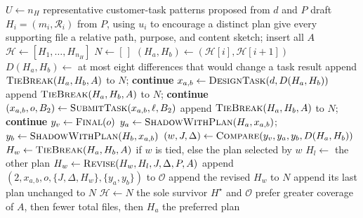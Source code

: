 \begin{algorithm*}[t]
\caption{Stage~2 adjacent-pair comparison of candidate skill plans.}
\label{alg:dd-stage2}
\scriptsize
\begin{algorithmic}[1]
  \State $U\gets n_H$ representative customer-task patterns proposed from $d$ and $P$
    \State draft $H_i=(m_i,\mathcal{R}_i)$ from $P$, using $u_i$ to encourage a distinct plan
    \State give every supporting file a relative path, purpose, and content sketch; insert all $A$
  \EndFor
  \State $\mathcal{H}\gets[H_1,\ldots,H_{n_H}]$
    \State $N\gets[\,]$
      \State $(H_a,H_b)\gets(\mathcal{H}[i],\mathcal{H}[i+1])$
      \State $D(H_a,H_b)\gets$ at most eight differences that would change a task result
        \State append $\Call{TieBreak}{H_a,H_b,A}$ to $N$; \textbf{continue}
      \EndIf
      \State $x_{a,b}\gets\Call{DesignTask}{d,D(H_a,H_b)}$
        \State append $\Call{TieBreak}{H_a,H_b,A}$ to $N$; \textbf{continue}
      \EndIf
      \State $(x_{a,b},o,B_2)\gets\Call{SubmitTask}{x_{a,b},\ell,B_2}$
        \State append $\Call{TieBreak}{H_a,H_b,A}$ to $N$; \textbf{continue}
      \EndIf
      \State $y_v\gets\Call{Final}{o}$
      \State $y_a\gets\Call{ShadowWithPlan}{H_a,x_{a,b}}$;
             $y_b\gets\Call{ShadowWithPlan}{H_b,x_{a,b}}$
      \State $(w,J,\Delta)\gets\Call{Compare}{y_v,y_a,y_b,D(H_a,H_b)}$
      \State $H_w\gets\Call{TieBreak}{H_a,H_b,A}$ if $w$ is tied, else the plan selected by $w$
      \State $H_l\gets$ the other plan
        \State $H_w\gets\Call{Revise}{H_w,H_l,J,\Delta,P,A}$
      \EndIf
      \State append $(2,x_{a,b},o,\{J,\Delta,H_w\},\{y_a,y_b\})$ to $\mathcal{O}$
      \State append the revised $H_w$ to $N$
    \EndFor
     \State append its last plan unchanged to $N$  \EndIf
    \State $\mathcal{H}\gets N$
  \EndWhile
  \State \Return the sole survivor $H^\star$ and $\mathcal{O}$
\EndProcedure
\Statex
{}
  \State prefer greater coverage of $A$, then fewer total files, then $H_a$
  \State \Return the preferred plan
\EndProcedure
\end{algorithmic}
\end{algorithm*}

